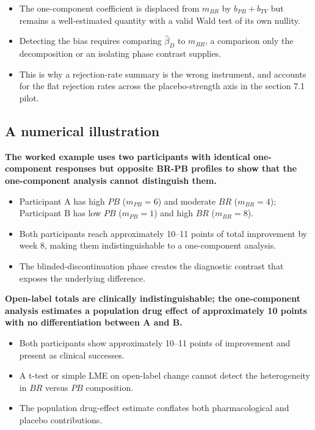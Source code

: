 \documentclass[
  11pt,
]{article}
\begin{document}
\begin{itemize}\setlength{\itemsep}{2pt}\setlength{\parskip}{0pt}
\item The one-component coefficient is displaced from $m_{BR}$ by $b_{PB} + b_{TV}$ but remains a well-estimated quantity with a valid Wald test of its own nullity.
\item Detecting the bias requires comparing $\hat\beta_D$ to $m_{BR}$, a comparison only the decomposition or an isolating phase contrast supplies.
\item This is why a rejection-rate summary is the wrong instrument, and accounts for the flat rejection rates across the placebo-strength axis in the section 7.1 pilot.
\end{itemize}

\subsection{A numerical illustration}\label{a-numerical-illustration}

\textbf{The worked example uses two participants with identical one-component responses but opposite BR-PB profiles to show that the one-component analysis cannot distinguish them.}

\begin{itemize}\setlength{\itemsep}{2pt}\setlength{\parskip}{0pt}
\item Participant A has high $PB$ ($m_{PB} = 6$) and moderate $BR$ ($m_{BR} = 4$); Participant B has low $PB$ ($m_{PB} = 1$) and high $BR$ ($m_{BR} = 8$).
\item Both participants reach approximately 10--11 points of total improvement by week 8, making them indistinguishable to a one-component analysis.
\item The blinded-discontinuation phase creates the diagnostic contrast that exposes the underlying difference.
\end{itemize}

\textbf{Open-label totals are clinically indistinguishable; the one-component analysis estimates a population drug effect of approximately 10 points with no differentiation between A and B.}

\begin{itemize}\setlength{\itemsep}{2pt}\setlength{\parskip}{0pt}
\item Both participants show approximately 10--11 points of improvement and present as clinical successes.
\item A t-test or simple LME on open-label change cannot detect the heterogeneity in $BR$ versus $PB$ composition.
\item The population drug-effect estimate conflates both pharmacological and placebo contributions.
\end{itemize}
\end{document}
